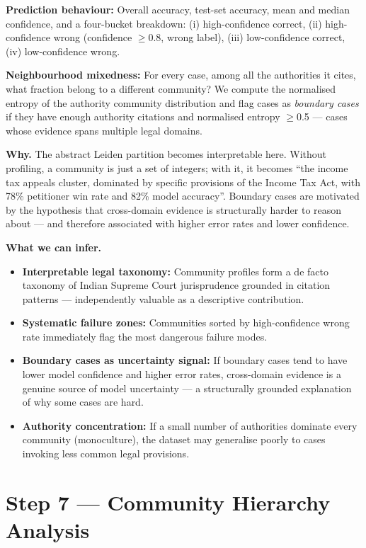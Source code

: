 \documentclass[11pt,a4paper]{article}
\begin{document}
\textbf{Prediction behaviour:} Overall accuracy, test-set accuracy, mean and median
confidence, and a four-bucket breakdown: (i) high-confidence correct, (ii)
high-confidence wrong (confidence $\geq$0.8, wrong label), (iii) low-confidence
correct, (iv) low-confidence wrong.

\textbf{Neighbourhood mixedness:} For every case, among all the authorities it cites,
what fraction belong to a different community? We compute the normalised entropy of
the authority community distribution and flag cases as \emph{boundary cases} if they
have enough authority citations and normalised entropy $\geq$0.5 --- cases whose
evidence spans multiple legal domains.

\textbf{Why.}
The abstract Leiden partition becomes interpretable here. Without profiling, a
community is just a set of integers; with it, it becomes ``the income tax appeals
cluster, dominated by specific provisions of the Income Tax Act, with 78\% petitioner
win rate and 82\% model accuracy''. Boundary cases are motivated by the hypothesis
that cross-domain evidence is structurally harder to reason about --- and therefore
associated with higher error rates and lower confidence.

\textbf{What we can infer.}
\begin{itemize}
  \item \textbf{Interpretable legal taxonomy:} Community profiles form a de facto
    taxonomy of Indian Supreme Court jurisprudence grounded in citation patterns ---
    independently valuable as a descriptive contribution.
  \item \textbf{Systematic failure zones:} Communities sorted by high-confidence
    wrong rate immediately flag the most dangerous failure modes.
  \item \textbf{Boundary cases as uncertainty signal:} If boundary cases tend to have
    lower model confidence and higher error rates, cross-domain evidence is a genuine
    source of model uncertainty --- a structurally grounded explanation of why some
    cases are hard.
  \item \textbf{Authority concentration:} If a small number of authorities dominate
    every community (monoculture), the dataset may generalise poorly to cases invoking
    less common legal provisions.
\end{itemize}

\bigskip

\section{Step 7 \texorpdfstring{\textcolor{stepgray}{---}}{---} Community Hierarchy Analysis}
\end{document}
